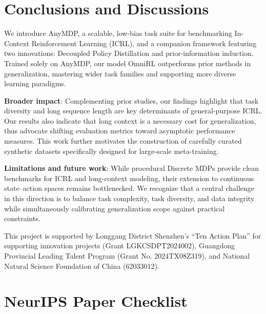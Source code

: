 \documentclass{article}
\begin{document}
\section{Conclusions and Discussions} \label{sec:conclusion}
We introduce AnyMDP, a scalable, low-bias task suite for benchmarking In-Context Reinforcement Learning (ICRL), and a companion framework featuring two innovations: Decoupled Policy Distillation and prior-information induction.
Trained solely on AnyMDP, our model OmniRL outperforms prior methods in generalization, mastering wider task families and supporting more diverse learning paradigms.

\textbf{Broader impact}: Complementing prior studies, our findings highlight that task diversity and long sequence length are key determinants of general-purpose ICRL. Our results also indicate that long context is a necessary cost for generalization, thus advocate shifting evaluation metrics toward asymptotic performance measures. This work further motivates the construction of carefully curated synthetic datasets specifically designed for large-scale meta-training.

\textbf{Limitations and future work}: While procedural Discrete MDPs provide clean benchmarks for ICRL and long-context modeling, their extension to continuous state–action spaces remains bottlenecked. We recognize that a central challenge in this direction is to balance task complexity, task diversity, and data integrity while simultaneously calibrating generalization scope against practical constraints.
\clearpage

\begin{ack}
This project is supported by Longgang District Shenzhen's “Ten Action Plan” for supporting innovation projects (Grant LGKCSDPT2024002), Guangdong Provincial Leading Talent Program (Grant No. 2024TX08Z319), and National Natural Science Foundation of China (62033012).
\end{ack}





\newpage
\section*{NeurIPS Paper Checklist}

\end{document}
